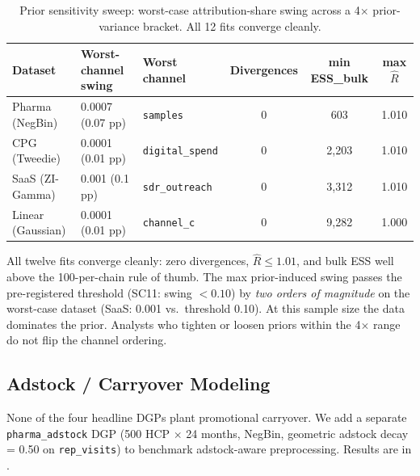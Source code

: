 \documentclass[review,12pt]{elsarticle}
\begin{document}
\begin{table}[ht]
\centering
\footnotesize
\caption{Prior sensitivity sweep: worst-case attribution-share swing across a
         4$\times$ prior-variance bracket. All 12 fits converge cleanly.}
\label{tab:prior_sensitivity}
\begin{tabularx}{\linewidth}{@{}LLLCCC@{}}
\toprule
Dataset & Worst-channel swing & Worst channel & Divergences & min ESS\_bulk & max $\hat{R}$ \\
\midrule
Pharma (NegBin)  & 0.0007 (0.07 pp) & \nolinkurl{samples}     & 0 & 603   & 1.010 \\
CPG (Tweedie)    & 0.0001 (0.01 pp) & \nolinkurl{digital_spend} & 0 & 2,203 & 1.010 \\
SaaS (ZI-Gamma)  & 0.001  (0.1 pp)  & \nolinkurl{sdr_outreach}  & 0 & 3,312 & 1.010 \\
Linear (Gaussian)& 0.0001 (0.01 pp) & \nolinkurl{channel_c}     & 0 & 9,282 & 1.000 \\
\bottomrule
\end{tabularx}
\end{table}

All twelve fits converge cleanly: zero divergences, $\hat{R} \leq 1.01$, and
bulk ESS well above the 100-per-chain rule of thumb. The max prior-induced swing
passes the pre-registered threshold (SC11: swing $< 0.10$) by \emph{two orders
of magnitude} on the worst-case dataset (SaaS: 0.001 vs.\ threshold 0.10). At
this sample size the data dominates the prior. Analysts who tighten or loosen
priors within the 4$\times$ range do not flip the channel ordering.

\subsection{Adstock / Carryover Modeling}
\label{sec:results:adstock}

None of the four headline DGPs plant promotional carryover. We add a separate
\texttt{pharma\_adstock} DGP (500 HCP $\times$ 24 months, NegBin, geometric
adstock decay \cite{broadbent1979oneway} = 0.50 on
\texttt{rep\_visits}) to benchmark adstock-aware
preprocessing. Results are in .
\end{document}
